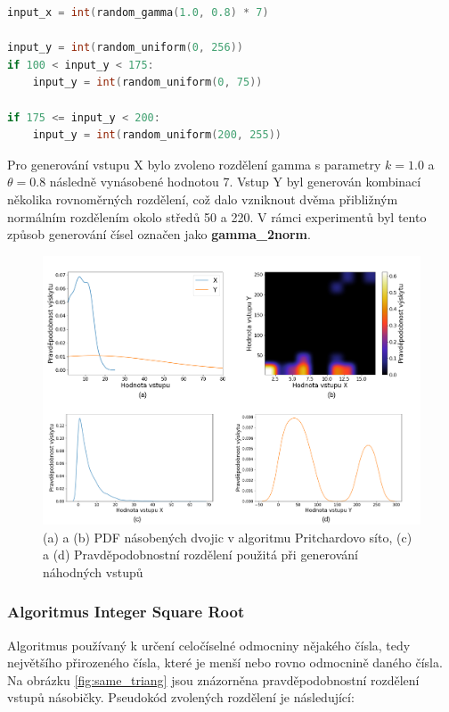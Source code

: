 \begin{lstlisting}[language={C}, label={lst:pritchard}]
input_x = int(random_gamma(1.0, 0.8) * 7)

input_y = int(random_uniform(0, 256))
if 100 < input_y < 175:
    input_y = int(random_uniform(0, 75))

if 175 <= input_y < 200:
    input_y = int(random_uniform(200, 255))
\end{lstlisting}

Pro generování vstupu X bylo zvoleno rozdělení gamma s parametry $k = 1.0$ a $\theta = 0.8$ následně vynásobené hodnotou 7. Vstup Y byl generován kombinací několika rovnoměrných rozdělení, což dalo vzniknout dvěma přibližným normálním rozdělením okolo středů 50 a 220. V rámci experimentů byl tento způsob generování čísel označen jako \textbf{gamma\_2norm}.

\begin{figure}[H]
    \centering
    \includegraphics[width=\textwidth]{obrazky-figures/gamma_2norm_all.png}
    \caption{(a) a (b) PDF násobených dvojic v algoritmu Pritchardovo síto, (c) a (d) Pravděpodobnostní rozdělení použitá při generování náhodných vstupů}
    \label{fig:gamma_2norm}
\end{figure}

\pagebreak

\subsubsection{Algoritmus Integer Square Root}
Algoritmus používaný k určení celočíselné odmocniny nějakého čísla, tedy největšího přirozeného čísla, které je menší nebo rovno odmocnině daného čísla. Na obrázku \ref{fig:same_triang} jsou znázorněna pravděpodobnostní rozdělení vstupů násobičky. Pseudokód zvolených rozdělení je následující:

